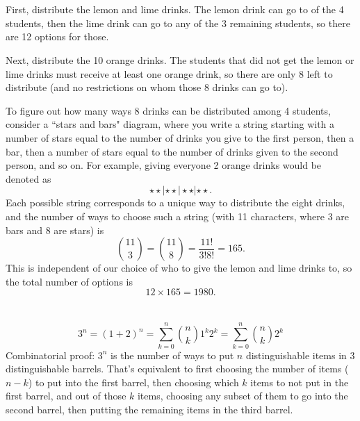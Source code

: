 \documentclass[12pt]{article}
\begin{document}
\section{}
\noindent{}\bigskip\par
First, distribute the lemon and lime drinks. The lemon drink can go to of the 4 students, then the lime drink can go to any of the 3 remaining students, so there are 12 options for those.
\par
Next, distribute the 10 orange drinks. The students that did not get the lemon or lime drinks must receive at least one orange drink, so there are only 8 left to distribute (and no restrictions on whom those 8 drinks can go to).
\par
To figure out how many ways 8 drinks can be distributed among 4 students, consider a ``stars and bars" diagram, where you write a string starting with a number of stars equal to the number of drinks you give to the first person, then a bar, then a number of stars equal to the number of drinks given to the second person, and so on. For example, giving everyone 2 orange drinks would be denoted as
\[ \star \star | \star \star | \star \star | \star \star. \]
Each possible string corresponds to a unique way to distribute the eight drinks, and the number of ways to choose such a string (with 11 characters, where 3 are bars and 8 are stars) is
\[ \binom{11}{3} = \binom{11}{8} = \frac{11!}{3!8!} = 165. \]
This is independent of our choice of who to give the lemon and lime drinks to, so the total number of options is
\[ 12 \times 165 = 1980. \]

\section{}
\noindent{}\bigskip\par

\[ 3^n= (1+2)^n=\sum_{k=0}^n \binom{n}{k} 1^k2^k = \sum_{k=0}^n \binom{n}{k} 2^k\]
Combinatorial proof: $3^n$ is the number of ways to put $n$ distinguishable items in 3 distinguishable barrels. That's equivalent to first choosing the number of items ($n-k$) to put into the first barrel, then choosing which $k$ items to not put in the first barrel, and out of those $k$ items, choosing any subset of them to go into the second barrel, then putting the remaining items in the third barrel.
\end{document}
